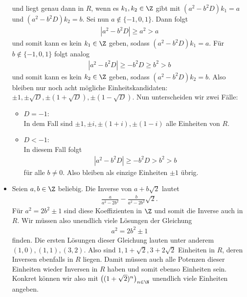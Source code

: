 \begin{solution}
\begin{itemize}
  und liegt genau dann in $R$, wenn es $k_1,k_2 \in \Z$ gibt mit $(a^2 - b^2D)k_1 = a$ und $(a^2 - b^2D)k_2 = b$.
  Sei nun $a \notin \{-1,0,1\}$. Dann folgt
  \begin{align*}
    |a^2 - b^2D| \geq a^2 > a
  \end{align*}
  und somit kann es kein $k_1 \in \Z$ geben, sodass $(a^2 - b^2D)k_1 = a$.
  Für $b \notin \{-1,0,1\}$ folgt analog
  \begin{align*}
    |a^2 - b^2D| \geq -b^2D \geq b^2 > b
  \end{align*}
  und somit kann es kein $k_2 \in \Z$ geben, sodass $(a^2 - b^2D)k_2 = b$.
  Also bleiben nur noch acht mögliche Einheitskandidaten: $\pm1, \pm\sqrt{D}, \pm(1+\sqrt{D}),\pm(1-\sqrt{D})$.
  Nun unterscheiden wir zwei Fälle:
  \begin{itemize}
    \item $D = -1$: \\
    In dem Fall sind $\pm1,\pm i, \pm (1+i), \pm (1-i)$ alle Einheiten von $R$.
    \item $D < -1$: \\
    In diesem Fall folgt
    \begin{align*}
      |a^2 - b^2D| \geq -b^2D > b^2 > b
    \end{align*}
    für alle $b \neq 0$. Also bleiben als einzige Einheiten $\pm 1$ übrig.
  \end{itemize}
  \item Seien $a,b \in \Z$ beliebig. Die Inverse von $a + b\sqrt{2}$ lautet
  \begin{align*}
    \frac{a}{a^2 - 2b^2} - \frac{b}{a^2-2b^2}\sqrt{2}.
  \end{align*}
  Für $a^2 = 2b^2 \pm 1$ sind diese Koeffizienten in $\Z$ und somit die Inverse
  auch in $R$. Wir müssen also unendlich viele Lösungen der Gleichung
  \begin{align*}
    a^2 = 2b^2 \pm 1
  \end{align*}
  finden. Die ersten Lösungen dieser Gleichung lauten unter anderem $(1,0),(1,1),(3,2)$.
  Also sind $1, 1 + \sqrt{2}, 3 + 2\sqrt{2}$ Einheiten in $R$, deren Inversen ebenfalls in $R$
  liegen. Damit müssen auch alle Potenzen dieser Einheiten wieder Inversen in $R$ haben
  und somit ebenso Einheiten sein. Konkret können wir also mit $\left((1 + \sqrt{2})^n\right)_{n \in \N}$
  unendlich viele Einheiten angeben.
\end{itemize}

\end{solution}
